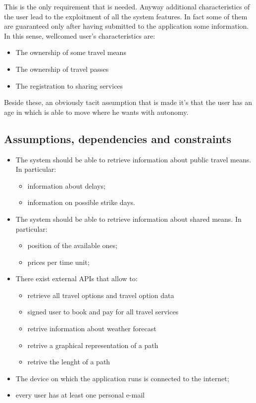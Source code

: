This is the only requirement that is needed. Anyway additional characteristics of the user lead to the exploitment of  all the system features. In fact some of them are guaranteed only after having submitted to the application some information.
In this sense, wellcomed user's characteristics are:

\begin{itemize}
\item The ownership of some travel means
\item The ownership of travel passes
\item The registration to sharing services
\end{itemize}

Beside these, an obviously tacit assumption that is made it's that the user has an age in which is able to move where he wants with autonomy.


\subsection{ Assumptions, dependencies and constraints}

\begin{itemize}

\item The system should be able to retrieve information about public travel means. In particular:
\begin{itemize}
\item information about delays;
\item information on possible strike days.
\end{itemize}

\item The system should be able to retrieve information about shared means. In particular:
\begin{itemize}
\item position of the available ones;
\item prices per time unit;
\end{itemize}

\item There exist external APIs that allow to:
\begin{itemize}
\item retrieve all travel options and travel option data
\item signed user to book and pay for all travel services
\item retrive information about weather forecast
\item retrive a graphical representation of a path
\item retrive the lenght of a path
\end{itemize}

\item The device on which the application runs is connected to the internet;

\item every user has at least one personal e-mail 

\end{itemize}




